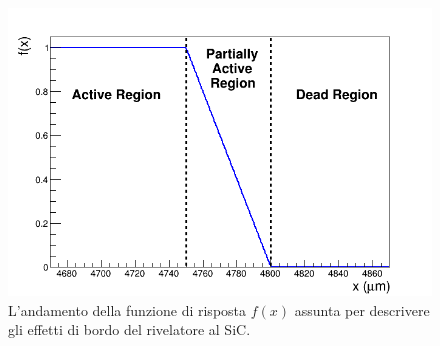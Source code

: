 \begin{figure} [!t]
	\centering
	\includegraphics[width=\textwidth, keepaspectratio]{Grafici_Tesi/Funzione/funzione.png}
	\caption{L'andamento della funzione di risposta $f(x)$ assunta per descrivere gli effetti di bordo del rivelatore al SiC.} \label{fig:funzione_risposta}
\end{figure}

